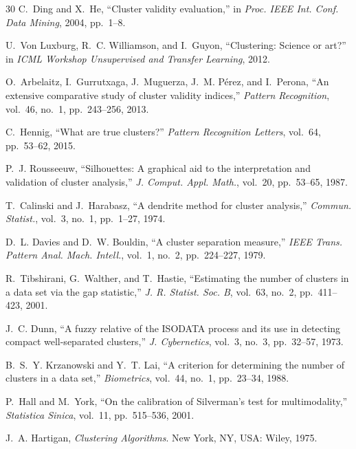 \documentclass[journal]{IEEEtran}
\begin{document}
\begin{thebibliography}{30}
C.~Ding and X.~He, ``Cluster validity evaluation,'' in \textit{Proc. IEEE Int. Conf. Data Mining}, 2004, pp.~1--8.

U.~Von Luxburg, R.~C. Williamson, and I.~Guyon, ``Clustering: Science or art?'' in \textit{ICML Workshop Unsupervised and Transfer Learning}, 2012.

O.~Arbelaitz, I.~Gurrutxaga, J.~Muguerza, J.~M. P\'erez, and I.~Perona, ``An extensive comparative study of cluster validity indices,'' \textit{Pattern Recognition}, vol.~46, no.~1, pp.~243--256, 2013.

C.~Hennig, ``What are true clusters?'' \textit{Pattern Recognition Letters}, vol.~64, pp.~53--62, 2015.

P.~J. Rousseeuw, ``Silhouettes: A graphical aid to the interpretation and validation of cluster analysis,'' \textit{J. Comput. Appl. Math.}, vol.~20, pp.~53--65, 1987.

T.~Calinski and J.~Harabasz, ``A dendrite method for cluster analysis,'' \textit{Commun. Statist.}, vol.~3, no.~1, pp.~1--27, 1974.

D.~L. Davies and D.~W. Bouldin, ``A cluster separation measure,'' \textit{IEEE Trans. Pattern Anal. Mach. Intell.}, vol.~1, no.~2, pp.~224--227, 1979.

R.~Tibshirani, G.~Walther, and T.~Hastie, ``Estimating the number of clusters in a data set via the gap statistic,'' \textit{J. R. Statist. Soc. B}, vol.~63, no.~2, pp.~411--423, 2001.

J.~C. Dunn, ``A fuzzy relative of the ISODATA process and its use in detecting compact well-separated clusters,'' \textit{J. Cybernetics}, vol.~3, no.~3, pp.~32--57, 1973.

B.~S.~Y. Krzanowski and Y.~T. Lai, ``A criterion for determining the number of clusters in a data set,'' \textit{Biometrics}, vol.~44, no.~1, pp.~23--34, 1988.

P.~Hall and M.~York, ``On the calibration of Silverman's test for multimodality,'' \textit{Statistica Sinica}, vol.~11, pp.~515--536, 2001.

J.~A. Hartigan, \textit{Clustering Algorithms}. New York, NY, USA: Wiley, 1975.


\end{thebibliography}
\end{document}
